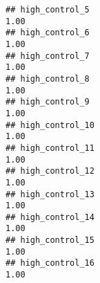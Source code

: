 \documentclass[
]{article}
\begin{document}
\begin{verbatim}
## high_control_5                                                                                                                                                                                                               1.00
## high_control_6                                                                                                                                                                                                               1.00
## high_control_7                                                                                                                                                                                                               1.00
## high_control_8                                                                                                                                                                                                               1.00
## high_control_9                                                                                                                                                                                                               1.00
## high_control_10                                                                                                                                                                                                              1.00
## high_control_11                                                                                                                                                                                                              1.00
## high_control_12                                                                                                                                                                                                              1.00
## high_control_13                                                                                                                                                                                                              1.00
## high_control_14                                                                                                                                                                                                              1.00
## high_control_15                                                                                                                                                                                                              1.00
## high_control_16                                                                                                                                                                                                              1.00

\end{verbatim}
\end{document}
